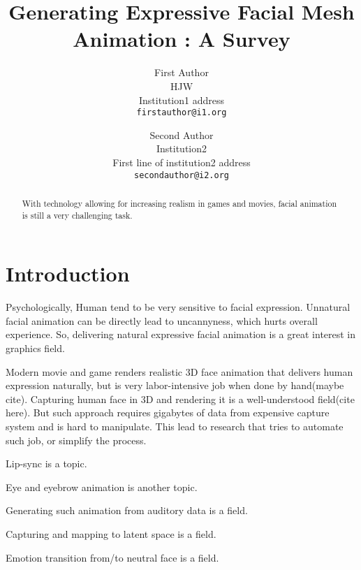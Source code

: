 \documentclass[10pt,twocolumn,letterpaper]{article}
\begin{document}
\title{Generating Expressive Facial Mesh Animation : A Survey}

\author{First Author\\
HJW\\
Institution1 address\\
{\tt\small firstauthor@i1.org}
\and
Second Author\\
Institution2\\
First line of institution2 address\\
{\tt\small secondauthor@i2.org}
}
\maketitle

\begin{abstract}
With technology allowing for increasing realism in games and movies, facial animation is still a very challenging task.
\end{abstract}

\section{Introduction}
\label{sec:intro}

Psychologically, Human tend to be very sensitive to facial expression.
Unnatural facial animation can be directly lead to uncannyness\cite{hanson2005upending}, which hurts overall experience.
So, delivering natural expressive facial animation is a great interest in graphics field.

Modern movie and game renders realistic 3D face animation that delivers human expression naturally, but is very labor-intensive job when done by hand(maybe cite).
Capturing human face in 3D and rendering it is a well-understood field(cite here).
But such approach requires gigabytes of data from expensive capture system and is hard to manipulate.
This lead to research that tries to automate such job, or simplify the process.

Lip-sync is a topic.

Eye and eyebrow animation is another topic.

Generating such animation from auditory data is a field.

Capturing and mapping to latent space is a field.

Emotion transition from/to neutral face is a field.


{\small


}
\end{document}
